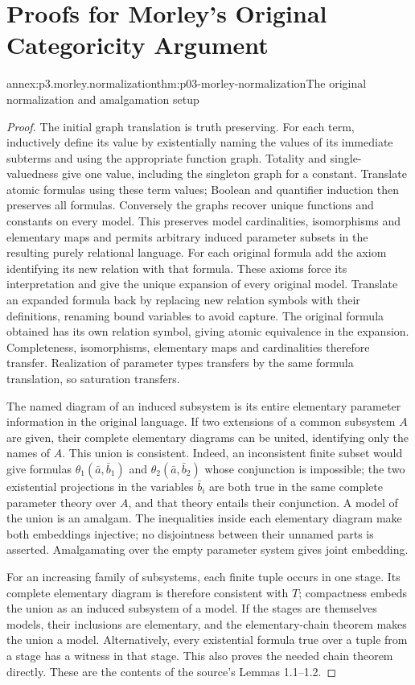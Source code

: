 \chapter{Proofs for Morley's Original Categoricity Argument}
\label{annex:p03-n-a-006-01}

\begin{annexitem}{annex:p3.morley.normalization}{thm:p03-morley-normalization}{The original normalization and amalgamation setup}
\begin{proof}
The initial graph translation is truth preserving. For each term,
inductively define its value by existentially naming the values of
its immediate subterms and using the appropriate function graph.
Totality and single-valuedness give one value, including the
singleton graph for a constant. Translate atomic formulas using
these term values; Boolean and quantifier induction then preserves
all formulas. Conversely the graphs recover unique functions and
constants on every model. This preserves model cardinalities,
isomorphisms and elementary maps and permits arbitrary induced
parameter subsets in the resulting purely relational language.
For each original formula add the axiom identifying its new relation
with that formula. These axioms force its interpretation and give
the unique expansion of every original model. Translate an expanded
formula back by replacing new relation symbols with their definitions,
renaming bound variables to avoid capture. The original formula
obtained has its own relation symbol, giving atomic equivalence in
the expansion. Completeness, isomorphisms, elementary maps and
cardinalities therefore transfer. Realization of parameter types
transfers by the same formula translation, so saturation transfers.

The named diagram of an induced subsystem is its entire elementary
parameter information in the original language. If two extensions
of a common subsystem \(A\) are given, their complete elementary
diagrams can be united, identifying only the names of \(A\). This
union is consistent. Indeed, an inconsistent finite subset would
give formulas \(\theta_1(\bar a,\bar b_1)\) and
\(\theta_2(\bar a,\bar b_2)\) whose conjunction is impossible;
the two existential projections in the variables \(\bar b_i\)
are both true in the same complete parameter theory over \(A\),
and that theory entails their conjunction. A model of the union
is an amalgam. The inequalities inside each elementary diagram
make both embeddings injective; no disjointness between their
unnamed parts is asserted. Amalgamating over the empty parameter
system gives joint embedding.

For an increasing family of subsystems, each finite tuple occurs
in one stage. Its complete elementary diagram is therefore
consistent with \(T\); compactness embeds the union as an induced
subsystem of a model. If the stages are themselves models, their
inclusions are elementary, and the elementary-chain theorem
makes the union a model. Alternatively, every existential
formula true over a tuple from a stage has a witness in that stage.
This also proves the needed chain theorem directly. These are
the contents of the source's Lemmas 1.1--1.2.
\end{proof}
\end{annexitem}

